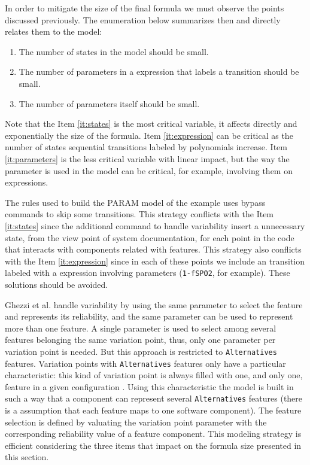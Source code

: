 \documentclass[conference]{IEEEtran}
\begin{document}
	
	In order to mitigate the size of the final formula we must observe
	the points discussed previously. The enumeration below summarizes then and
	directly relates them to the model:
	
	\begin{enumerate}
		\item \label{it:states} The number of states in the model should be small.		
		\item \label{it:expression} The number of parameters in a expression that labels
		a transition should be small.		
		\item \label{it:parameters} The number of parameters itself should be small. 	
	\end{enumerate}
	
	Note that the Item \ref{it:states} is the most critical variable, it affects directly
	and exponentially the size of the formula. Item \ref{it:expression} can be
	critical as the number of states sequential transitions labeled by polynomials increase. 
	Item \ref{it:parameters} is the less critical variable with linear impact, but
	the way the parameter is used in the model can be critical, for example, involving them
	on expressions.		
		
	 The rules used to build the PARAM model of the example uses bypass commands
	 to skip some transitions. This strategy conflicts with the Item \ref{it:states}
	 since the additional command to handle variability insert a unnecessary state, from the
	 view point of system  documentation, for each point in the code that interacts with
	 components related with features. This strategy also conflicts with the Item \ref{it:expression}
	 since in each of these points we include an transition labeled with a expression involving
	 parameters (\texttt{1-fSPO2}, for example). These solutions should be 
	 avoided.
	 
	Ghezzi et al. handle variability by using the same parameter to select the feature and 
	represents  its reliability, and the same parameter can be used to
	represent more than one feature. A single parameter is used to select among
	several features belonging the same variation point, thus, only one parameter
	per variation point is needed. But this approach is restricted to
	\texttt{Alternatives} features. Variation points with \texttt{Alternatives} features only have a particular characteristic:
	this kind of variation point is always filled with one,
	and only one, feature in a given configuration \cite{czarnecki}. Using this characteristic
	the model is built in such a way that a component can represent several \texttt{Alternatives} features 
	(there is a assumption that each feature maps to one software component).
	The feature selection is defined by valuating the variation point parameter with 
	the corresponding reliability value of a feature component. This modeling strategy 
	is efficient considering the three items that impact on the formula size 
	presented in this section.
	
\end{document}
